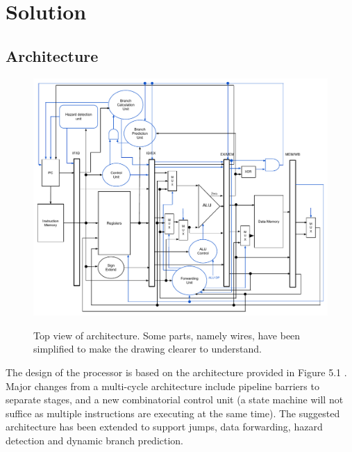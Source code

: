 \chapter{Solution}


\section{Architecture}

\begin{figure}[ht!]
    \begin{center}
        \includegraphics[width=\textwidth]{assets/RTL.pdf}
        \label{fig:architecture}
        \caption{Top view of architecture. Some parts, namely wires,
                 have been simplified to make the drawing clearer to understand.}
    \end{center}
\end{figure}

The design of the processor is based on the architecture provided in Figure 5.1 \cite[p. 50]{compendium}.
Major changes from a multi-cycle architecture include pipeline barriers to separate stages,
and a new combinatorial control unit (a state machine will not suffice as multiple instructions are executing at the same time).
The suggested architecture has been extended to support jumps, data forwarding, hazard detection and dynamic branch prediction.

